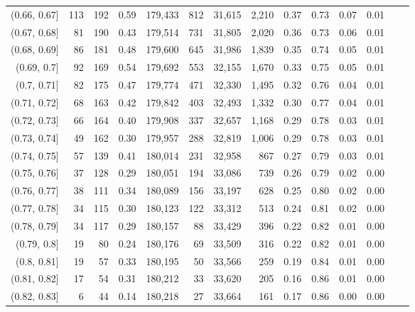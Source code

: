 \begin{tabular}{rrrrrrrrrrrrrr}
(0.66, 0.67]   &    113 &  192 &    0.59 &  179,433 &      812 &  31,615 &   2,210 &  0.37 &  0.73 &  0.07 &      0.01 \\
(0.67, 0.68]   &     81 &  190 &    0.43 &  179,514 &      731 &  31,805 &   2,020 &  0.36 &  0.73 &  0.06 &      0.01 \\
(0.68, 0.69]   &     86 &  181 &    0.48 &  179,600 &      645 &  31,986 &   1,839 &  0.35 &  0.74 &  0.05 &      0.01 \\
(0.69, 0.7]    &     92 &  169 &    0.54 &  179,692 &      553 &  32,155 &   1,670 &  0.33 &  0.75 &  0.05 &      0.01 \\
(0.7, 0.71]    &     82 &  175 &    0.47 &  179,774 &      471 &  32,330 &   1,495 &  0.32 &  0.76 &  0.04 &      0.01 \\
(0.71, 0.72]   &     68 &  163 &    0.42 &  179,842 &      403 &  32,493 &   1,332 &  0.30 &  0.77 &  0.04 &      0.01 \\
(0.72, 0.73]   &     66 &  164 &    0.40 &  179,908 &      337 &  32,657 &   1,168 &  0.29 &  0.78 &  0.03 &      0.01 \\
(0.73, 0.74]   &     49 &  162 &    0.30 &  179,957 &      288 &  32,819 &   1,006 &  0.29 &  0.78 &  0.03 &      0.01 \\
(0.74, 0.75]   &     57 &  139 &    0.41 &  180,014 &      231 &  32,958 &     867 &  0.27 &  0.79 &  0.03 &      0.01 \\
(0.75, 0.76]   &     37 &  128 &    0.29 &  180,051 &      194 &  33,086 &     739 &  0.26 &  0.79 &  0.02 &      0.00 \\
(0.76, 0.77]   &     38 &  111 &    0.34 &  180,089 &      156 &  33,197 &     628 &  0.25 &  0.80 &  0.02 &      0.00 \\
(0.77, 0.78]   &     34 &  115 &    0.30 &  180,123 &      122 &  33,312 &     513 &  0.24 &  0.81 &  0.02 &      0.00 \\
(0.78, 0.79]   &     34 &  117 &    0.29 &  180,157 &       88 &  33,429 &     396 &  0.22 &  0.82 &  0.01 &      0.00 \\
(0.79, 0.8]    &     19 &   80 &    0.24 &  180,176 &       69 &  33,509 &     316 &  0.22 &  0.82 &  0.01 &      0.00 \\
(0.8, 0.81]    &     19 &   57 &    0.33 &  180,195 &       50 &  33,566 &     259 &  0.19 &  0.84 &  0.01 &      0.00 \\
(0.81, 0.82]   &     17 &   54 &    0.31 &  180,212 &       33 &  33,620 &     205 &  0.16 &  0.86 &  0.01 &      0.00 \\
(0.82, 0.83]   &      6 &   44 &    0.14 &  180,218 &       27 &  33,664 &     161 &  0.17 &  0.86 &  0.00 &      0.00 \\

\end{tabular}
